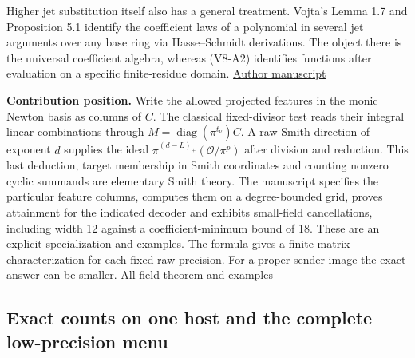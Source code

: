 \documentclass[
  11pt,
]{article}
\begin{document}
Higher jet substitution itself also has a general treatment. Vojta's
Lemma 1.7 and Proposition 5.1 identify the coefficient laws of a
polynomial in several jet arguments over any base ring via
Hasse--Schmidt derivations. The object there is the universal
coefficient algebra, whereas (V8-A2) identifies functions after evaluation
on a specific finite-residue domain.
\href{https://math.berkeley.edu/~vojta/jets.pdf}{Author manuscript}

\textbf{Contribution position.} Write the allowed projected features in
the monic Newton basis as columns of \(C\). The classical fixed-divisor
test reads their integral linear combinations through
\(M=\operatorname{diag}(\pi^{t_\nu})C\). A raw Smith direction of
exponent \(d\) supplies the ideal \(\pi^{(d-L)_+}(\mathcal O/\pi^p)\)
after division and reduction. This last deduction, target membership in
Smith coordinates and counting nonzero cyclic summands are elementary
Smith theory. The manuscript specifies the particular feature columns,
computes them on a degree-bounded grid, proves attainment for the
indicated decoder and exhibits small-field cancellations, including
width 12 against a coefficient-minimum bound of 18. These are an
explicit specialization and examples. The formula gives a finite matrix
characterization for each fixed raw precision. For a proper sender image
the exact answer can be smaller.
\hyperref[v8-section-jet-newton-smith]{All-field theorem and examples}

\subsection{Exact counts on one host and the complete low-precision
menu}\label{v8-exact-counts-on-one-host-and-the-complete-low-precision-menu}
\end{document}
